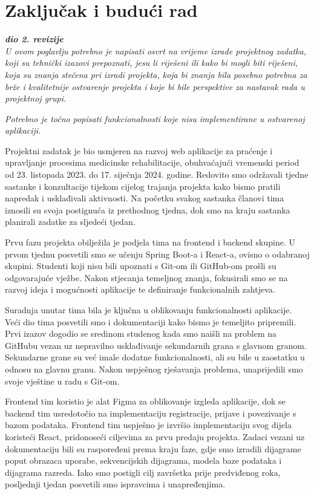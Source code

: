 \chapter{Zaključak i budući rad}
		
		\textbf{\textit{dio 2. revizije}}\\
		
		 \textit{U ovom poglavlju potrebno je napisati osvrt na vrijeme izrade projektnog zadatka, koji su tehnički izazovi prepoznati, jesu li riješeni ili kako bi mogli biti riješeni, koja su znanja stečena pri izradi projekta, koja bi znanja bila posebno potrebna za brže i kvalitetnije ostvarenje projekta i koje bi bile perspektive za nastavak rada u projektnoj grupi.}
		
		 \textit{Potrebno je točno popisati funkcionalnosti koje nisu implementirane u ostvarenoj aplikaciji.}
		

  Projektni zadatak je bio usmjeren na razvoj web aplikacije za praćenje i upravljanje procesima medicinske rehabilitacije, obuhvaćajući vremenski period od 23. listopada 2023. do 17. siječnja 2024. godine. Redovito smo održavali tjedne sastanke i konzultacije tijekom cijelog trajanja projekta kako bismo pratili napredak i usklađivali aktivnosti. Na početku svakog sastanka članovi tima iznosili su svoja postignuća iz prethodnog tjedna, dok smo na kraju sastanka planirali zadatke za sljedeći tjedan.

Prvu fazu projekta obilježila je podjela tima na frontend i backend skupine. U prvom tjednu posvetili smo se učenju Spring Boot-a i React-a, ovisno o odabranoj skupini. Studenti koji nisu bili upoznati s Git-om ili GitHub-om prošli su odgovarajuće vježbe. Nakon stjecanja temeljnog znanja, fokusirali smo se na razvoj ideja i mogućnosti aplikacije te definiranje funkcionalnih zahtjeva.

Suradnja unutar tima bila je ključna u oblikovanju funkcionalnosti aplikacije. Veći dio tima posvetili smo i dokumentaciji kako bismo je temeljito pripremili. Prvi izazov dogodio se sredinom studenog kada smo naišli na problem na GitHubu vezan uz nepravilno usklađivanje sekundarnih grana s glavnom granom. Sekundarne grane su već imale dodatne funkcionalnosti, ali su bile u zaostatku u odnosu na glavnu granu. Nakon uspješnog rješavanja problema, unaprijedili smo svoje vještine u radu s Git-om.

Frontend tim koristio je alat Figma za oblikovanje izgleda aplikacije, dok se backend tim usredotočio na implementaciju registracije, prijave i povezivanje s bazom podataka. Frontend tim uspješno je izvršio implementaciju svog dijela koristeći React, pridonoseći ciljevima za prvu predaju projekta. Zadaci vezani uz dokumentaciju bili su raspoređeni prema kraju faze, gdje smo izradili dijagrame poput obrazaca uporabe, sekvencijskih dijagrama, modela baze podataka i dijagrama razreda. Iako smo postigli cilj završetka prije predviđenog roka, posljednji tjedan posvetili smo ispravcima i unapređenjima.

